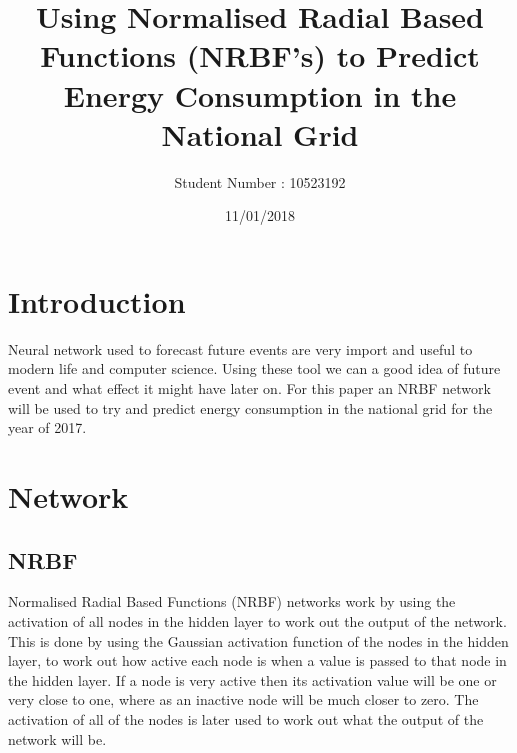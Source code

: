 \documentclass{IEEEtran}[11pt]
\title{Using Normalised Radial Based Functions (NRBF's) to Predict Energy Consumption in the National Grid}
\author{Student Number : 10523192}
\date{11/01/2018}
\begin{document}

\maketitle

\newpage
\section{Introduction}
\begin{flushleft}
  Neural network used to forecast future events are very import and useful to
  modern life and computer science. Using these tool we can a good idea of
  future event and what effect it might have later on. For this paper an NRBF
  network will be used to try and predict energy consumption in the national grid
  for the year of 2017.
\end{flushleft}
\section{Network}
\subsection{NRBF}
\begin{flushleft}
  Normalised Radial Based Functions (NRBF) networks work by using the activation
  of all nodes in the hidden layer to work out the output of the network. This
  is done by using the Gaussian activation function of the nodes in the hidden
  layer, to work out how active each node is when a value is passed to that
  node in the hidden layer. If a node is very active then its activation value
  will be one or very close to one, where as an inactive node will be much
  closer to zero. The activation of all of the nodes is later used to work out
  what the output of the network will be.
\end{flushleft}
\end{document}
